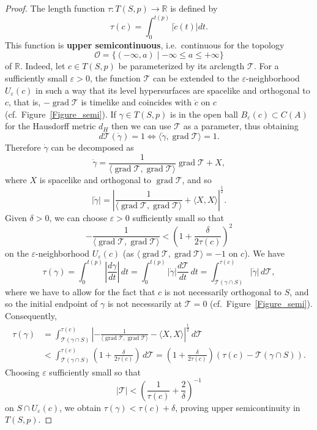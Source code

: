 \documentclass[10pt]{amsart}
\newcommand{\bbR}{\mathbb{R}}      %
\newcommand{\grad}{\operatorname{grad}}
\newcommand{\cT}{\mathcal{T}}
\theoremstyle{definition}
\theoremstyle{remark}
\begin{document}
\begin{proof}
The length function $\tau:T(S,p) \to \bbR$ is defined by
\[
\tau(c)=\int_0^{t(p)} |\dot{c}(t)| dt.
\]
This function is {\bf upper semicontinuous}, i.e.~continuous for the topology 
\[
\mathcal{O}=\{(-\infty,a) \mid -\infty \leq a \leq +\infty \}
\]
of $\bbR$. Indeed, let $c \in T(S,p)$ be parameterized by its arclength $\cT$. For a sufficiently small $\varepsilon > 0$, the function $\cT$ can be extended to the $\varepsilon$-neighborhood $U_{\varepsilon}(c)$ in such a way that its level hypersurfaces are spacelike and orthogonal to $c$, that is, $-\grad \cT$ is timelike and coincides with $\dot{c}$ on $c$ (cf.~Figure~\ref{Figure_semi}). If $\gamma \in T(S,p)$ is in the open ball $B_\varepsilon(c) \subset C(A)$ for the Hausdorff metric $d_H$ then we can use $\cT$ as a parameter, thus obtaining
\[
d\cT(\dot{\gamma}) = 1 \Leftrightarrow \langle \dot{\gamma}, \grad \cT \rangle = 1.
\]
Therefore $\dot{\gamma}$ can be decomposed as
\[
\dot{\gamma} = \frac1{\langle \grad \cT, \grad \cT \rangle} \grad \cT + X,
\]  
where $X$ is spacelike and orthogonal to $\grad \cT$, and so
\[
|\dot{\gamma}| = \left| \frac1{\langle \grad \cT, \grad \cT \rangle} + \langle X,X \rangle \right|^\frac12.
\]
Given $\delta > 0$, we can choose $\varepsilon>0$ sufficiently small so that
\[
-\frac1{\langle \grad \cT, \grad \cT \rangle} < \left(1 + \frac{\delta}{2\tau(c)}\right)^2
\]
on the $\varepsilon$-neighborhood $U_{\varepsilon}(c)$ (as $\langle \grad \cT, \grad \cT \rangle=-1$ on $c$). We have
\[
\tau(\gamma) =  \int_0^{t(p)} \left|\frac{d \gamma}{dt} \right| \, dt = \int_0^{t(p)} |\dot{\gamma}| \frac{d\cT}{dt} \, dt = \int_{\cT(\gamma\cap S)}^{\tau(c)} |\dot{\gamma}| \, d \cT,
\]
where we have to allow for the fact that $c$ is not necessarily orthogonal to $S$, and so the initial endpoint of $\gamma$ is not necessarily at $\cT=0$ (cf.~Figure~\ref{Figure_semi}). Consequently,
\begin{align*}
\tau(\gamma) & = \int_{\cT(\gamma\cap S)}^{\tau(c)} \left| -\frac1{\langle \grad \cT, \grad \cT \rangle} - \langle X,X \rangle \right|^\frac12 \, d \cT \\
& < \int_{\cT(\gamma\cap S)}^{\tau(c)} \left(1 + \frac{\delta}{2\tau(c)}\right) \, d \cT  = \left(1 + \frac{\delta}{2\tau(c)}\right) \left(\tau(c) - \cT(\gamma\cap S)\right).
\end{align*}
Choosing $\varepsilon$ sufficiently small so that 
\[
|\cT|< \left( \frac1{\tau(c)} + \frac{2}{\delta} \right)^{-1}
\]
on $S \cap U_{\varepsilon}(c)$, we obtain $\tau(\gamma) < \tau(c) + \delta$, proving upper semicontinuity in $T(S,p)$.


\end{proof}
\end{document}
